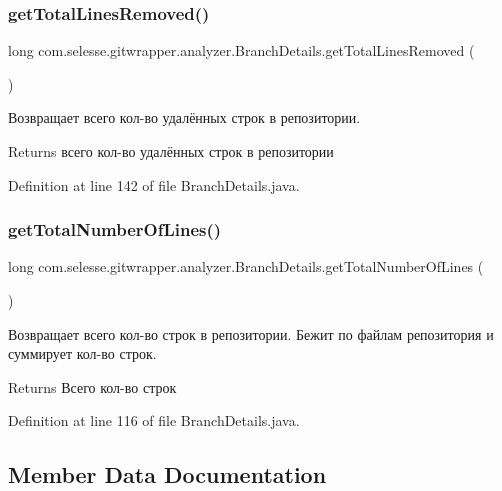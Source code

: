 \subsubsection{\texorpdfstring{get\+Total\+Lines\+Removed()}{getTotalLinesRemoved()}}
{\footnotesize\ttfamily long com.\+selesse.\+gitwrapper.\+analyzer.\+Branch\+Details.\+get\+Total\+Lines\+Removed (\begin{DoxyParamCaption}{ }\end{DoxyParamCaption})}

Возвращает всего кол-\/во удалённых строк в репозитории.

\begin{DoxyReturn}{Returns}
всего кол-\/во удалённых строк в репозитории 
\end{DoxyReturn}


Definition at line 142 of file Branch\+Details.\+java.

\mbox{\label{classcom_1_1selesse_1_1gitwrapper_1_1analyzer_1_1_branch_details_a2139f8bb85331b7cb09cab717beefa81}} 
\subsubsection{\texorpdfstring{get\+Total\+Number\+Of\+Lines()}{getTotalNumberOfLines()}}
{\footnotesize\ttfamily long com.\+selesse.\+gitwrapper.\+analyzer.\+Branch\+Details.\+get\+Total\+Number\+Of\+Lines (\begin{DoxyParamCaption}{ }\end{DoxyParamCaption})}

Возвращает всего кол-\/во строк в репозитории. Бежит по файлам репозитория и суммирует кол-\/во строк.

\begin{DoxyReturn}{Returns}
Всего кол-\/во строк 
\end{DoxyReturn}


Definition at line 116 of file Branch\+Details.\+java.



\subsection{Member Data Documentation}
\mbox{\label{classcom_1_1selesse_1_1gitwrapper_1_1analyzer_1_1_branch_details_a176eae56c354402699cf8ed0288a3a4c}} 

